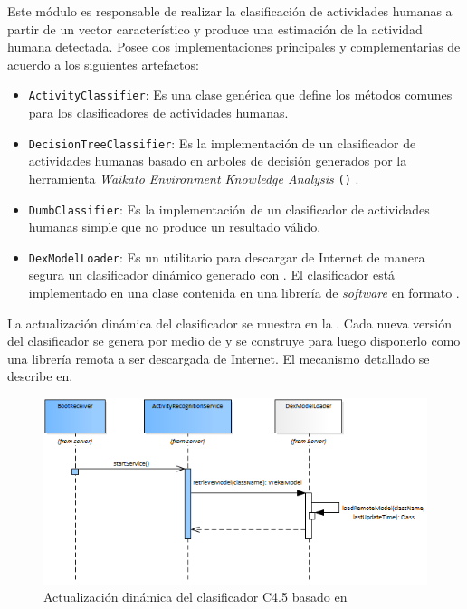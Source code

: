 Este módulo es responsable de realizar la clasificación de actividades
humanas a partir de un vector característico y produce una estimación
de la actividad humana detectada. Posee dos implementaciones principales
y complementarias de acuerdo a los siguientes artefactos:
\begin{itemize}
\item \texttt{\small{}ActivityClassifier}: Es una clase genérica que define
los métodos comunes para los clasificadores de actividades humanas.
\item \texttt{\small{}DecisionTreeClassifier}: Es la implementación de un
clasificador de actividades humanas basado en arboles de decisión
generados por la herramienta \emph{Waikato Environment Knowledge Analysis}
\texttt{()} \cite{Frank2016}.
\item \texttt{\small{}DumbClassifier}: Es la implementación de un clasificador
de actividades humanas simple que no produce un resultado válido.
\item \texttt{\small{}DexModelLoader}: Es un utilitario para descargar de
Internet de manera segura un clasificador dinámico generado con .
El clasificador está implementado en una clase contenida en una librería
de \emph{software} en formato .
\end{itemize}
La actualización dinámica del clasificador se muestra en la .
Cada nueva versión del clasificador se genera por medio de 
y se construye para luego disponerlo como una librería remota a ser
descargada de Internet. El mecanismo detallado se describe en\cite{Falsina2014}.

\begin{figure}[H]
\begin{centering}
\includegraphics[width=1\columnwidth]{capitulo-5/graphics/service_classi}
\par\end{centering}
\caption[Actualización del clasificador C4.5]{\label{fig5:service-classi}Actualización dinámica del clasificador
C4.5 basado en }
\end{figure}


